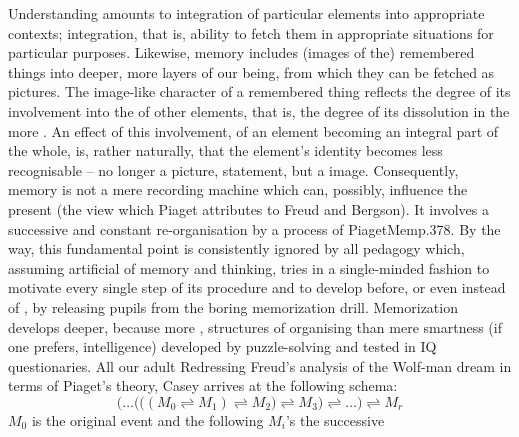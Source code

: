 \pa Understanding amounts to integration of particular elements into appropriate
contexts; integration, that is, ability to fetch them in appropriate situations
for particular purposes. Likewise, memory includes (images of the) remembered
things into deeper, more  layers of our being, from which they can
be fetched as  pictures. The image-like character of a remembered
thing reflects the degree of its involvement into the  of other
elements, that is, the degree of its dissolution in the more .
An effect of this involvement, of an element becoming an integral part of the
whole, is, rather naturally, that the element's identity becomes less
recognisable -- no longer a  picture,  statement, but a
 image.
%
Consequently, memory is not a mere recording machine which can, possibly,
influence the present (the view which Piaget attributes to Freud and Bergson).
It involves a successive and constant re-organisation by a process of
\citet{active and selective structuring.}{PiagetMem}{p.378. By the way, this fundamental point is
  consistently ignored by all pedagogy which, assuming artificial
   of memory and thinking, tries in a single-minded fashion to
  motivate every single step of its procedure and to develop 
  before, or even instead of , by releasing pupils from the boring
  memorization drill. Memorization develops deeper, because more ,
  structures of organising  than mere smartness (if one prefers,
  intelligence) developed by puzzle-solving and tested in IQ questionaries.}
All our adult  Redressing
Freud's analysis of the Wolf-man dream in terms of Piaget's theory, Casey
arrives at the following schema:
\[
  \bigg(\ldots\Big(\big( (M_{0} \rightleftharpoons M_{1}) 
     \rightleftharpoons M_{2}\big)
     \rightleftharpoons M_{3}\Big) \rightleftharpoons \ldots \bigg)
     \rightleftharpoons M_{r}
\]
$M_{0}$ is the original event and the following $M_{i}$'s the successive
